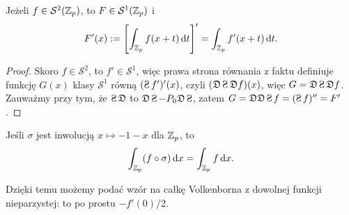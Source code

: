 
\begin{fakt}
	Jeżeli $f \in \mathcal S^2(\mathbb Z_p)$, to $F \in \mathcal S^1(\mathbb Z_p)$ i 
	\[
		F'(x) := \left[\int_{\mathbb Z_p} f(x+t) \,\textrm{d}t\right]' = \int_{\mathbb Z_p} f'(x+t)\,\textrm{d}t.
	\]
\end{fakt}

\begin{proof}
	Skoro $f \in \mathcal S^2$, to $f' \in \mathcal S^1$, więc prawa strona równania z faktu definiuje funkcję $G(x)$ klasy $\mathcal S^1$ równą $(\suma f')'(x)$, czyli $(\mathfrak D \suma \mathfrak D f)(x)$, więc $G = \mathfrak D \suma \mathfrak D f$.
	Zauważmy przy tym, że $\suma \mathfrak D$ to $\mathfrak D \suma - P_0 \mathfrak D \suma$, zatem	$G = \mathfrak D \mathfrak D \suma f = (\suma f)'' = F'$. %
\end{proof}

\begin{fakt}
	Jeśli $\sigma$ jest inwolucją $x \mapsto -1-x$ dla $\mathbb Z_p$, to 
	\[
		\int_{\mathbb Z_p} (f \circ \sigma) \,\textrm{d}x = \int_{\mathbb Z_p} f \,\textrm{d}x.
	\]
\end{fakt}

Dzięki temu możemy podać wzór na całkę Volkenborna z dowolnej funkcji nieparzystej: to po prostu $-{f'(0)}/ 2$.